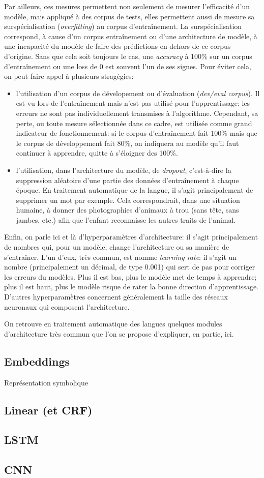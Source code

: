 Par ailleurs, ces mesures permettent non seulement de mesurer l'efficacité d'un modèle, mais appliqué à des corpus de tests, elles permettent aussi de mesure sa surspécialisation\label{deep-learning:overfitting} (\textit{overfitting}) au corpus d'entraînement. La surspécialisation correspond, à cause d'un corpus entraînement ou d'une architecture de modèle, à une incapacité du modèle de faire des prédictions en dehors de ce corpus d'origine. Sans que cela soit toujours le cas, une \textit{accuracy} à 100\% sur un corpus d'entraînement ou une loss de 0 est souvent l'un de ses signes. Pour éviter cela, on peut faire appel à plusieurs stragégies:
\begin{itemize}
    \item l'utilisation d'un corpus de dévelopement ou d'évaluation (\textit{dev/eval corpus}). Il est vu lors de l'entraînement mais n'est pas utilisé pour l'apprentissage: les erreurs ne sont pas individuellement transmises à l'algorithme. Cependant, sa perte, ou toute mesure sélectionnée dans ce cadre, est utilisée comme grand indicateur de fonctionnement: si le corpus d'entraînement fait 100\% mais que le corpus de développement fait 80\%, on indiquera au modèle qu'il faut continuer à apprendre, quitte à s'éloigner des 100\%.
    \item l'utilisation, dans l'architecture du modèle, de \textit{dropout}, c'est-à-dire la suppression aléatoire d'une partie des données d'entraînement à chaque époque. En traitement automatique de la langue, il s'agit principalement de supprimer un mot par exemple. Cela correspondrait, dans une situation humaine, à donner des photographies d'animaux à trou (sans tête, sans jambes, etc.) afin que l'enfant reconnaisse les autres traits de l'animal. %
\end{itemize}

Enfin, on parle ici et là d'hyperparamètres d'architecture: il s'agit principalement de nombres qui, pour un modèle, change l'architecture ou sa manière de s'entraîner. L'un d'eux, très commun, est nomme \textit{learning rate}: il s'agit un nombre (principalement un décimal, de type 0.001) qui sert de pas pour corriger les erreurs du modèles. Plus il est bas, plus le modèle met de temps à apprendre; plus il est haut, plus le modèle risque de rater la bonne direction d'apprentissage. D'autres hyperparamètres concernent généralement la taille des réseaux neuronaux qui composent l'architecture. 

On retrouve en traitement automatique des langues quelques modules d'architecture très commun que l'on se propose d'expliquer, en partie, ici.

\subsection{Embeddings}
\label{deep-learning:embeddings}

Représentation symbolique
\subsection{Linear (et CRF)}

\subsection{LSTM}

\subsection{CNN}